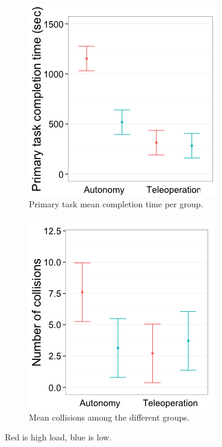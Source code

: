 \documentclass[a4paper,12pt,oneside,openright]{bhamthesis}
\begin{document}
\begin{figure}
	\centering
	\begin{subfigure}[b]{0.49\textwidth}
		\centering
		\includegraphics[width=\textwidth]{chapter3_fig/time-cropped_pilot.png}
		\caption{Primary task mean completion time per group.}
		\label{subfig:totalTime_pilot}
	\end{subfigure}
	\hfill
	\begin{subfigure}[b]{0.49\textwidth}
		\centering
		\includegraphics[width=\textwidth]{chapter3_fig/collisions-cropped_pilot.png}
		\caption{Mean collisions among the different groups.}
		\label{subfig:totalCollisions_pilot}
	\end{subfigure}
	\hfill
	\caption{Red is high load, blue is low.}
	\label{fig:time_collisions_pilo}
\end{figure}
\end{document}
